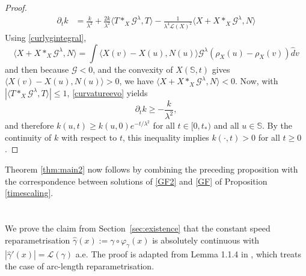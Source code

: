 \documentclass[a4paper,11pt]{amsart}
\theoremstyle{definition}\newtheorem*{definition}{Definition}
\theoremstyle{definition} \newtheorem{proposition}[theorem]{Proposition}
\theoremstyle{definition}\newtheorem{lemma}[theorem]{Lemma}
\theoremstyle{definition}\newtheorem{corollary}[theorem]{Corollary}
\theoremstyle{definition}\newtheorem{example}{Example}
\theoremstyle{remark}\newtheorem*{remark}{Remark}
\def\S{\mathbb{S}}
\def\length{\mathcal L}
\begin{document}
\begin{proof}
\begin{align}
\partial_t k&=\frac{k}{\lambda^2}+\frac{2k}{\lambda^2}\langle T\ast_X\mathcal G^\lambda,T\rangle-\frac{1}{\lambda^4\length(X)^2}\langle X+X\ast_X\mathcal G^\lambda,N\rangle
\end{align}
Using \eqref{curlygintegral},
\[
\langle X+X\ast_X\mathcal G^\lambda,N\rangle=\int\langle X(v)-X(u),N(u)\rangle \mathcal{G}^\lambda(\rho_X(u)-\rho_X(v))\hat dv
\]
and then because $\mathcal G<0 $, and the convexity of $X(\S,t)$ gives $\langle X(v)-X(u),N(u)\rangle>0$, we have $\langle X+X\ast_X\mathcal G^\lambda,N\rangle<0 $. Now, with $|\langle T\ast_X\mathcal G^\lambda,T\rangle|\leq 1$, \eqref{curvatureevo} yields
\[
\partial_t k \geq -\frac{k}{\lambda^2},
\]
and therefore $k(u,t)\geq k(u,0)e^{-t/\lambda^2}$ for all $t\in[0,t_*)$ and all $u\in \S$. 
By the continuity of $k$ with respect to $t$, this inequality 
implies $k(\cdot,t)>0$ for all $t\ge0$.
\end{proof}

Theorem \ref{thm:main2} now follows by combining the preceding proposition with the correspondence between solutions of \eqref{GF2} and \eqref{GF} of Proposition \ref{timescaling}.

\appendix

\section{}\label{appendixA}
We prove the claim from Section~\ref{sec:existence} that the constant speed reparametrisation $\hat \gamma(x):=\gamma\circ \varphi_\gamma(x)$ is absolutely continuous with $|\hat \gamma'(x)|=\length(\gamma)$ a.e. The proof is adapted from Lemma 1.1.4 in \cite{AmbrosioGigliSavare2008}, which treats the case of arc-length reparametrisation. 
\end{document}
